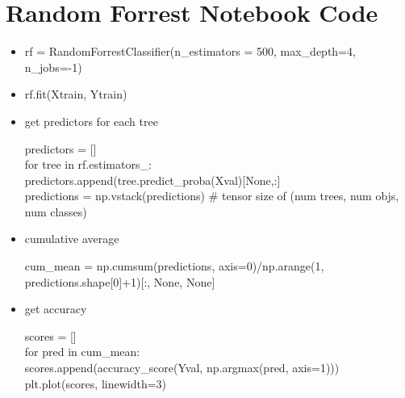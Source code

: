 \documentclass[a4paper]{report}
\newcommand{\brown}{\color{brown}}
\renewcommand{\t}{\hspace*{0.5cm}}
\newenvironment{tightcenter}{
  \setlength\topsep{0pt}
  \setlength\parskip{0pt}
  \begin{center}
  }{
  \end{center}
}
\newenvironment{codesnip}[1]
{\begin{tightcenter}\begin{minipage}{.85\textwidth}#1}
{\end{minipage}\end{tightcenter}}
\begin{document}
\section{Random Forrest Notebook Code}
\begin{itemize}
  \item {\brown rf = RandomForrestClassifier(n\_estimators = 500, max\_depth=4, n\_jobs=-1)}
  \item {\brown rf.fit(Xtrain, Ytrain)}
  \item get predictors for each tree
    \begin{codesnip}{\brown}
      predictors = [] \\
      for tree in rf.estimators\_: \\
      \t predictors.append(tree.predict\_proba(Xval)[None,:] \\
	
	predictions = np.vstack(predictions)  \# tensor size of (num trees, num objs, num classes)
    \end{codesnip}
  \item cumulative average
    \begin{codesnip}{\brown}
      cum\_mean = np.cumsum(predictions, axis=0)/np.arange(1, predictions.shape[0]+1)[:, None, None]
    \end{codesnip}
  \item get accuracy
    \begin{codesnip}{\brown}
      scores = [] \\
      for pred in cum\_mean: \\
      \t scores.append(accuracy\_score(Yval, np.argmax(pred, axis=1)))	\\
      plt.plot(scores, linewidth=3)			
    \end{codesnip}
\end{itemize}
\end{document}
